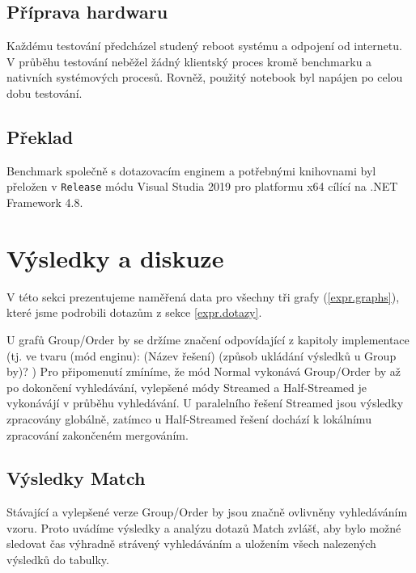 \subsection{Příprava hardwaru}

Každému testování předcházel studený reboot systému a odpojení od internetu. 
V průběhu testování neběžel žádný klientský proces kromě benchmarku a nativních systémových procesů. 
Rovněž, použitý notebook byl napájen po celou dobu testování.


\subsection{Překlad}

Benchmark společně s dotazovacím enginem a potřebnými knihovnami byl přeložen v \verb+Release+ módu Visual Studia 2019 pro platformu x64 cílící na .NET Framework 4.8. 

\clearpage

\section{Výsledky a diskuze}

V této sekci prezentujeme naměřená data pro všechny tři grafy (\ref{expr.graphs}), které jsme podrobili dotazům z sekce \ref{expr.dotazy}.

U grafů Group/Order by se držíme značení odpovídající z kapitoly implementace (tj. ve tvaru (mód enginu): (Název řešení) (způsob ukládání výsledků u Group by)? )
Pro připomenutí zmíníme, že mód Normal vykonává Group/Order by až po dokončení vyhledávání, vylepšené módy Streamed a Half-Streamed je vykonávájí v průběhu vyhledávání.
U paralelního řešení Streamed jsou výsledky zpracovány globálně, zatímco u Half-Streamed řešení dochází k lokálnímu zpracování zakončeném mergováním.

\subsection{Výsledky Match}

Stávající a vylepšené verze Group/Order by jsou značně ovlivněny vyhledáváním vzoru. 
Proto uvádíme výsledky a analýzu dotazů Match zvlášť, aby bylo možné sledovat čas výhradně strávený vyhledáváním a uložením všech nalezených výsledků do tabulky.

